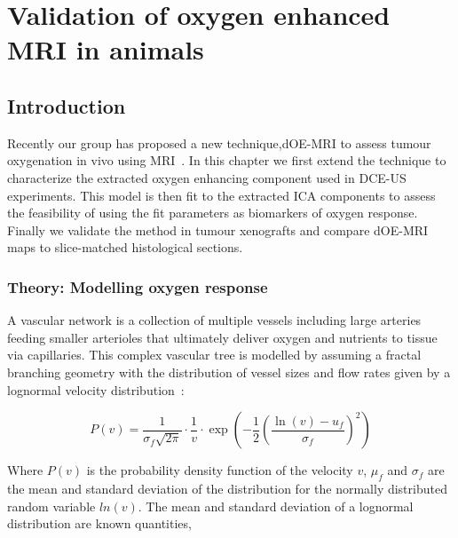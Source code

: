 
\chapter{Validation of oxygen enhanced MRI in animals}
\label{ch:oemri2}

\section{Introduction}

Recently our group has proposed a new technique,\ac{dOE-MRI} to assess tumour oxygenation in vivo using MRI~\cite{Moosvi:2018ca}.
In this chapter we first extend the technique to characterize the extracted oxygen enhancing component used in \ac{DCE-US} experiments.
This model is then fit to the extracted \ac{ICA} components to assess the feasibility of using the fit parameters as biomarkers of oxygen response.
Finally we validate the method in tumour xenografts and compare \ac{dOE-MRI} maps to slice-matched histological sections.

\subsection{Theory: Modelling oxygen response}
\label{sec:lognormalfitting_theory}
A vascular network is a collection of multiple vessels including large arteries feeding smaller arterioles that ultimately deliver oxygen and nutrients to tissue via capillaries.
This complex vascular tree is modelled by assuming a fractal branching geometry with the distribution of vessel sizes and flow rates given by a lognormal velocity distribution~\cite{Qian:2000ca}:

\begin{equation}
P(v)=\frac{1}{\sigma_{f} \sqrt{2 \pi}} \cdot \frac{1}{v} \cdot \exp \left(-\frac{1}{2}\left(\frac{\ln (v)-u_{f}}{\sigma_{f}}\right)^{2}\right)
\end{equation}

Where $P(v)$ is the probability density function of the velocity $v$, $\mu_f$ and $\sigma_f$ are the mean and standard deviation of the distribution for the normally distributed random variable $ln(v)$.
The mean and standard deviation of a lognormal distribution are known quantities,

